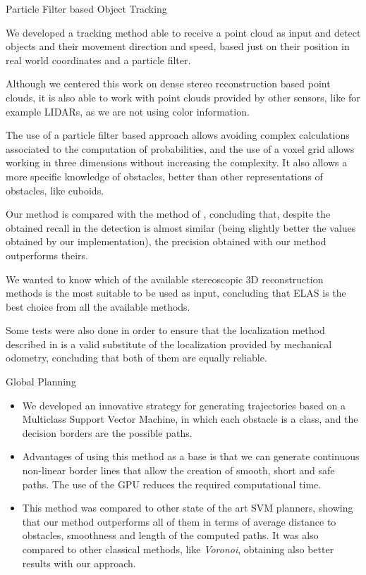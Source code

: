 \begin{frame}{Particle Filter based Object Tracking}
  \small
  \begin{itemize}
   {
    \item We developed a tracking method able to receive a point cloud as input and detect objects and their movement direction and speed, based just on their position in real world coordinates and a particle filter. 
    \item Although we centered this work on dense stereo reconstruction based point clouds, it is also able to work with point clouds provided by other sensors, like for example LIDARs, as we are not using color information. 
    \item The use of a particle filter based approach allows avoiding complex calculations associated to the computation of probabilities, and the use of a voxel grid allows working in three dimensions without increasing the complexity. It also allows a more specific knowledge of obstacles, better than other representations of obstacles, like cuboids.
    }
     {
    \item Our method is compared with the method of \cite{danescu2012particle}, concluding that, despite the obtained recall in the detection is almost similar (being slightly better the values obtained by our implementation), the precision obtained with our method outperforms theirs. 
    \item We wanted to know which of the available stereoscopic 3D reconstruction methods is the most suitable to be used as input, concluding that ELAS is the best choice from all the available methods.
    \item Some tests were also done in order to ensure that the localization method described in \cite{geiger2011stereoscan} is a valid substitute of the localization provided by mechanical odometry, concluding that both of them are equally reliable.
    }
  \end{itemize}
\end{frame}

\begin{frame}{Global Planning}
  \small
  \begin{itemize}
    \item We developed an innovative strategy for generating trajectories based on a Multiclass Support Vector Machine, in which each obstacle is a class, and the decision borders are the possible paths. 
    \item Advantages of using this method as a base is that we can generate continuous non-linear border lines that allow the creation of smooth, short and safe paths. The use of the GPU reduces the required computational time.
    \item This method was compared to other state of the art SVM planners, showing that our method outperforms all of them in terms of average distance to obstacles, smoothness and length of the computed paths. It was also compared to other classical methods, like \emph{Voronoi}, obtaining also better results with our approach.
  \end{itemize}
\end{frame}

